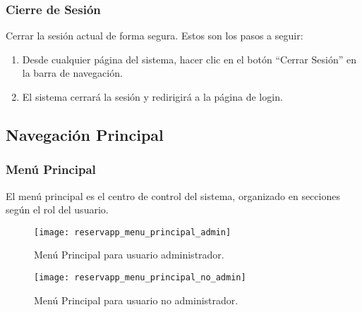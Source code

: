 \subsubsection{Cierre de Sesión}
Cerrar la sesión actual de forma segura. Estos son los pasos a seguir:

\begin{enumerate}
   \item Desde cualquier página del sistema, hacer clic en el botón ``Cerrar Sesión'' en la barra de navegación.
   \item El sistema cerrará la sesión y redirigirá a la página de login.
\end{enumerate}

\subsection{Navegación Principal}

\subsubsection{Menú Principal}
El menú principal es el centro de control del sistema, organizado en secciones según el rol del usuario.

\begin{figure}[H]
	\centering
		\texttt{[image: reservapp\_menu\_principal\_admin]}
	\caption{Menú Principal para usuario administrador.}
	\label{fig:reservapp_menu_principal_admin}
\end{figure}

\begin{figure}[H]
	\centering
		\texttt{[image: reservapp\_menu\_principal\_no\_admin]}
	\caption{Menú Principal para usuario no administrador.}
	\label{fig:reservapp_menu_principal_no_admin}
\end{figure}

